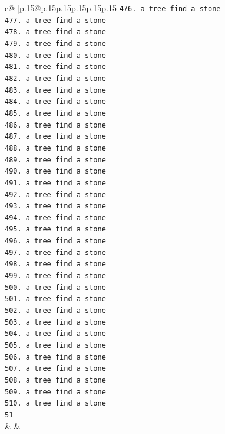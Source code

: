 \documentclass{article}
\begin{document}
{\begin{supertabular}{c@{$\;$}|p{.15\linewidth}@{}p{.15\linewidth}p{.15\linewidth}p{.15\linewidth}p{.15\linewidth}p{.15\linewidth}}
{{{\texttt{476. a tree find a stone} \\
\texttt{477. a tree find a stone} \\
\texttt{478. a tree find a stone} \\
\texttt{479. a tree find a stone} \\
\texttt{480. a tree find a stone} \\
\texttt{481. a tree find a stone} \\
\texttt{482. a tree find a stone} \\
\texttt{483. a tree find a stone} \\
\texttt{484. a tree find a stone} \\
\texttt{485. a tree find a stone} \\
\texttt{486. a tree find a stone} \\
\texttt{487. a tree find a stone} \\
\texttt{488. a tree find a stone} \\
\texttt{489. a tree find a stone} \\
\texttt{490. a tree find a stone} \\
\texttt{491. a tree find a stone} \\
\texttt{492. a tree find a stone} \\
\texttt{493. a tree find a stone} \\
\texttt{494. a tree find a stone} \\
\texttt{495. a tree find a stone} \\
\texttt{496. a tree find a stone} \\
\texttt{497. a tree find a stone} \\
\texttt{498. a tree find a stone} \\
\texttt{499. a tree find a stone} \\
\texttt{500. a tree find a stone} \\
\texttt{501. a tree find a stone} \\
\texttt{502. a tree find a stone} \\
\texttt{503. a tree find a stone} \\
\texttt{504. a tree find a stone} \\
\texttt{505. a tree find a stone} \\
\texttt{506. a tree find a stone} \\
\texttt{507. a tree find a stone} \\
\texttt{508. a tree find a stone} \\
\texttt{509. a tree find a stone} \\
\texttt{510. a tree find a stone} \\
\texttt{51} \\
            }
        }
    }
    & & \\ \\


\end{supertabular}}
\end{document}
